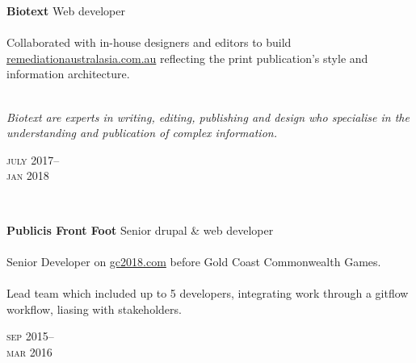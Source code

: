 \begin{minipage}[t]{0.70\textwidth}
\textbf{Biotext}\phantom{..} Web developer\\
\\
Collaborated with in-house designers and editors to build 
\href{https://www.remediationaustralasia.com.au/}{remediationaustralasia.com.au} 
reflecting the print publication's style and information architecture.
\\
\\
{\small
\textit{
Biotext are experts in writing, editing, publishing and design who specialise
in the understanding and publication of complex information.}
\par}
\end{minipage}
\begin{minipage}[t]{0.30\textwidth}
{
\hfill \textsc{july} 2017--\\ 
\hspace*{0pt} \hfill \textsc{jan} 2018
\par
}
\end{minipage}
\\

\begin{minipage}[t]{0.70\textwidth}
\textbf{Publicis Front Foot}\phantom{..} Senior drupal \& web developer \\
\\
Senior Developer on \href{https://www.gc2018.com/}{gc2018.com} 
before Gold Coast Commonwealth Games.
\\
\\
Lead team which included up to 5 developers, integrating work through a 
gitflow workflow, liasing with stakeholders.
\\
{\small
\textit{}
\par}
\end{minipage}
\begin{minipage}[t]{0.30\textwidth}
{
\hfill \textsc{sep} 2015--\\ 
\hspace*{0pt} \hfill \textsc{mar} 2016
\par
}
\end{minipage}
\\


